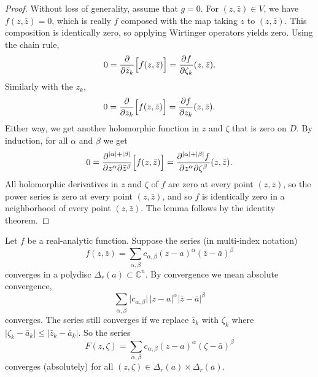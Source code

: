 \documentclass[12pt,openany]{book}
\newcommand{\sabs}[1]{\lvert {#1} \rvert}
\newcommand{\C}{{\mathbb{C}}}
\theoremstyle{plain}
\theoremstyle{remark}
\theoremstyle{definition}
\theoremstyle{exercise}
\theoremstyle{example}
\begin{document}
\begin{proof}
Without loss of generality, assume that $g=0$.
For $(z,\bar{z}) \in V$, we have $f(z,\bar{z}) = 0$, which is really
$f$ composed with the map taking $z$ to $(z,\bar{z})$.  This
composition is identically zero, so applying Wirtinger operators yields zero.
Using the chain rule,
\begin{equation*}
0 =
\frac{\partial}{\partial \bar{z}_k} \Bigl[f(z,\bar{z})\Bigr]
=
\frac{\partial f}{\partial \zeta_k}(z,\bar{z}) .
\end{equation*}
Similarly with the $z_k$,
\begin{equation*}
0 =
\frac{\partial}{\partial z_k} \Bigl[f(z,\bar{z})\Bigr]
=
\frac{\partial f}{\partial z_k}(z,\bar{z}) .
\end{equation*}
Either way, we get another holomorphic function in $z$ and $\zeta$
that is zero on $D$.
By induction, for all $\alpha$ and $\beta$ we get
\begin{equation*}
0 =
\frac{\partial^{\sabs{\alpha}+\sabs{\beta}}}{\partial z^\alpha \partial \bar{z}^\beta} \Bigl[f(z,\bar{z})\Bigr]
=
\frac{\partial^{\sabs{\alpha}+\sabs{\beta}} f}{\partial z^\alpha \partial
\zeta^\beta}(z,\bar{z}) .
\end{equation*}
All holomorphic derivatives in $z$ and $\zeta$ of $f$ are zero at every point
$(z,\bar{z})$, so the power series is zero at every point $(z,\bar{z})$,
and so $f$ is identically zero in a neighborhood of every
point $(z,\bar{z})$.  The lemma follows by the identity
theorem.
\end{proof}

Let $f$ be a real-analytic function.  Suppose
the series (in multi-index notation)
\begin{equation*}
f(z,\bar{z}) =
\sum_{\alpha,\beta} c_{\alpha,\beta} {(z-a)}^\alpha
{(\bar{z}-\bar{a})}^\beta
\end{equation*}
converges in a polydisc $\Delta_r(a) \subset \C^n$.
By convergence we mean absolute
convergence,
\begin{equation*}
\sum_{\alpha,\beta} \sabs{c_{\alpha,\beta}} \, \sabs{z-a}^\alpha
\sabs{\bar{z}-\bar{a}}^\beta
\end{equation*}
converges.
The series still converges if we replace $\bar{z}_k$  with
$\zeta_k$ where $\sabs{\zeta_k-\bar{a}_k} \leq \sabs{\bar{z}_k-\bar{a}_k}$.
So the series
\begin{equation*}
F(z,\zeta) =
\sum_{\alpha,\beta} c_{\alpha,\beta} {(z-a)}^\alpha
{(\zeta-\bar{a})}^\beta
\end{equation*}
converges (absolutely) for all $(z,\zeta) \in \Delta_r(a) \times \Delta_r(\bar{a})$.
\end{document}
